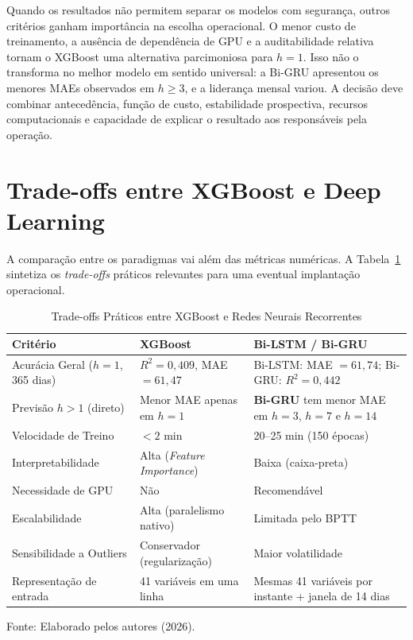 Quando os resultados não permitem separar os modelos com segurança, outros critérios ganham importância na escolha operacional. O menor custo de treinamento, a ausência de dependência de GPU e a auditabilidade relativa tornam o XGBoost uma alternativa parcimoniosa para $h=1$. Isso não o transforma no melhor modelo em sentido universal: a Bi-GRU apresentou os menores MAEs observados em $h\geq3$, e a liderança mensal variou. A decisão deve combinar antecedência, função de custo, estabilidade prospectiva, recursos computacionais e capacidade de explicar o resultado aos responsáveis pela operação.

\section{Trade-offs entre XGBoost e Deep Learning}

A comparação entre os paradigmas vai além das métricas numéricas. A Tabela~\ref{tab:tradeoffs} sintetiza os \textit{trade-offs} práticos relevantes para uma eventual implantação operacional.

\begin{table}[H]
\caption{Trade-offs Práticos entre XGBoost e Redes Neurais Recorrentes}
\label{tab:tradeoffs}
\begin{center}
\small
\begin{tabular}{p{4cm} p{4.5cm} p{5cm}}
\toprule
\textbf{Critério} & \textbf{XGBoost} & \textbf{Bi-LSTM / Bi-GRU} \\
\midrule
Acurácia Geral ($h=1$, 365 dias) & $R^2 = 0{,}409$, MAE $= 61{,}47$ & Bi-LSTM: MAE $=61{,}74$; Bi-GRU: $R^2=0{,}442$ \\
Previsão $h>1$ (direto) & Menor MAE apenas em $h=1$ & \textbf{Bi-GRU} tem menor MAE em $h=3$, $h=7$ e $h=14$ \\
Velocidade de Treino & $<2$ min & 20--25 min (150 épocas) \\
Interpretabilidade & Alta (\textit{Feature Importance}) & Baixa (caixa-preta) \\
Necessidade de GPU & Não & Recomendável \\
Escalabilidade & Alta (paralelismo nativo) & Limitada pelo BPTT \\
Sensibilidade a Outliers & Conservador (regularização) & Maior volatilidade \\
Representação de entrada & 41 variáveis em uma linha & Mesmas 41 variáveis por instante + janela de 14 dias \\
\bottomrule
\end{tabular}
\normalsize
\end{center}
\small{Fonte: Elaborado pelos autores (2026).}
\end{table}

